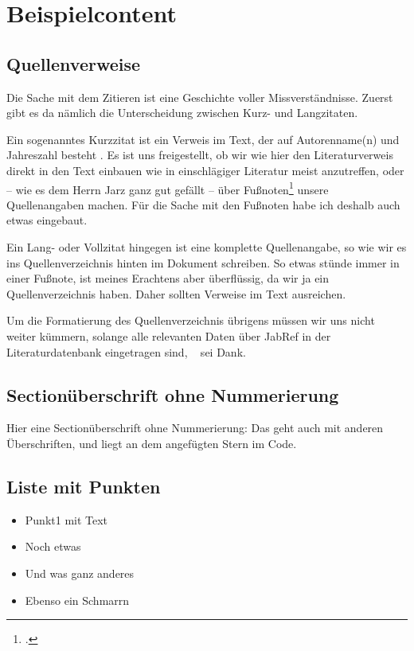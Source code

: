 ﻿\chapter{Beispielcontent}

\section{Quellenverweise}

Die Sache mit dem Zitieren ist eine Geschichte voller Missverständnisse. Zuerst gibt es da nämlich die Unterscheidung zwischen Kurz- und Langzitaten.

Ein sogenanntes Kurzzitat ist ein Verweis im Text, der auf Autorenname(n) und Jahreszahl besteht . Es ist uns freigestellt, ob wir wie hier den Literaturverweis direkt in den Text einbauen wie in einschlägiger Literatur meist anzutreffen\cites[S.72]{BIBTEXKEYBook}, oder -- wie es dem Herrn Jarz ganz gut gefällt -- über Fußnoten\footcites[S.39]{BIBTEXKEYarticle} unsere Quellenangaben machen. Für die Sache mit den Fußnoten habe ich deshalb auch etwas eingebaut.

Ein Lang- oder Vollzitat hingegen ist eine komplette Quellenangabe, so wie wir es ins Quellenverzeichnis hinten im Dokument schreiben. So etwas stünde immer in einer Fußnote, ist meines Erachtens aber überflüssig, da wir ja ein Quellenverzeichnis haben. Daher sollten Verweise im Text ausreichen.

Um die Formatierung des Quellenverzeichnis übrigens müssen wir uns nicht weiter kümmern, solange alle relevanten Daten über JabRef in der Literaturdatenbank eingetragen sind, \BibTeX~ sei Dank.


\section*{Sectionüberschrift ohne Nummerierung}
Hier eine Sectionüberschrift ohne Nummerierung: Das geht auch mit anderen Überschriften, und liegt an dem angefügten Stern im Code.


\section{Liste mit Punkten}
\begin{itemize}
\item Punkt1 mit Text
\item Noch etwas
\item Und was ganz anderes
\item Ebenso ein Schmarrn
\end{itemize}


